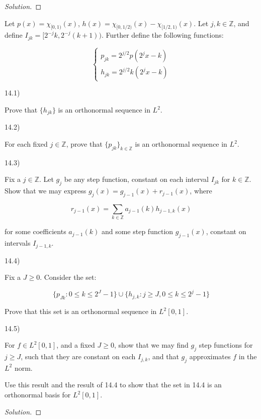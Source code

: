 \documentclass[10pt]{article}
\newenvironment{problem}[2][]{\begin{trivlist}
\item[\hskip \labelsep {\bfseries #1}\hskip \labelsep {\bfseries #2.}]}{\end{trivlist}}
\begin{document}
\begin{proof}[Solution]

\end{proof}

\begin{problem}{Question 14}

Let $p(x) = \chi_{[0,1)}(x)$, $h(x) = \chi_{[0,1/2)}(x) - \chi_{[1/2,1)}(x)$. Let $j, k \in\mathbb{Z}$, and define $I_{jk} = [2^{-j}k, 2^{-j}(k+1))$. Further define the following functions:

$$ \begin{cases} p_{jk} = 2^{j/2} p (2^{j} x - k) \\ h_{jk} = 2^{j/2} k (2^{j} x - k) \end{cases}$$

14.1)

Prove that $\{ h_{jk} \}$ is an orthonormal sequence in $L^2$.

14.2)

For each fixed $j \in \mathbb{Z}$, prove that $\{ p_{jk} \}_{k \in \mathbb{Z}}$ is an orthonormal sequence in $L^2$.  

14.3)

Fix a $j \in \mathbb{Z}$. Let $g_j$ be any step function, constant on each interval $I_{jk}$ for $k \in \mathbb{Z}$. Show that we may express $g_j(x) = g_{j-1}(x) + r_{j-1}(x)$, where

$$ r_{j-1}(x) = \sum_{k \in \mathbb{Z}} a_{j-1}(k)h_{j-1, k}(x) $$

for some coefficients $a_{j-1}(k)$ and some step function $g_{j-1}(x)$, constant on intervals $I_{j-1,k}$.

14.4)

Fix a $J \geq 0$. Consider the set:

$$ \{ p_{Jk} : 0 \leq k \leq 2^J - 1 \} \cup \{ h_{j,k} : j \geq J, 0 \leq k \leq 2^j - 1 \}$$

Prove that this set is an orthonormal sequence in $L^2[0,1]$.

14.5)

For $f \in L^2[0,1]$, and a fixed $J \geq 0$, show that we may find $g_j$ step functions for $j \geq J$, such that they are constant on each $I_{j,k}$, and that $g_j$ approximates $f$ in the $L^2$ norm.

Use this result and the result of 14.4 to show that the set in 14.4 is an orthonormal basis for $L^2[0,1]$.


\end{problem}

\begin{proof}[Solution]

\end{proof}
\end{document}
